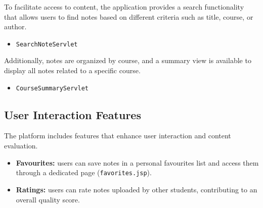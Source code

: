 To facilitate access to content, the application provides a search functionality
that allows users to find notes based on different criteria such as title,
course, or author.

\begin{itemize}
    \item \texttt{SearchNoteServlet}
\end{itemize}
Additionally, notes are organized by course, and a summary view is available
to display all notes related to a specific course.

\begin{itemize}
    \item \texttt{CourseSummaryServlet}
\end{itemize}

\subsection{User Interaction Features}

The platform includes features that enhance user interaction and content evaluation.

\begin{itemize}
    \item \textbf{Favourites:} users can save notes in a personal favourites list
    and access them through a dedicated page (\texttt{favorites.jsp}).

    \item \textbf{Ratings:} users can rate notes uploaded by other students,
    contributing to an overall quality score.
\end{itemize}